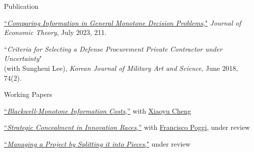 \begin{rSection}{Publication}
	
	\begin{etaremune}
		\item \href{https://yonggyun-yg-kim.github.io/files/Research%20papers/GMDP_JET.pdf}{``\textit{Comparing Information in General Monotone Decision Problems},"} 
		\textit{Journal of Economic Theory}, July 2023, 211. 
		
		\item 
		``\textit{Criteria for Selecting a Defense Procurement Private Contractor under Uncertainty}"\\
		(with Sungheui Lee), \textit{Korean Journal of Military Art and Science}, June 2018, 74(2). 
	\end{etaremune}
	
	
	
\end{rSection}

\begin{rSection}{Working Papers}
	
	\begin{etaremune}
		
		\item \href{https://arxiv.org/pdf/2404.15158.pdf}{``\textit{Blackwell-Monotone Information Costs},''} with \href{https://xiaoyu-cheng.com/}{Xiaoyu Cheng}
		
		\item \href{https://yonggyun-yg-kim.github.io/files/Research%20papers/SCIR_public.pdf}{``\textit{Strategic Concealment in Innovation Races},''}   with \href{https://www.franciscopoggi.com/}{Francisco Poggi}, under review
		
		\item \href{https://ssrn.com/abstract=3450802}{``\textit{Managing a Project by Splitting it into Pieces},"} under review

	\end{etaremune}
	
	
\end{rSection}


%
%
%



